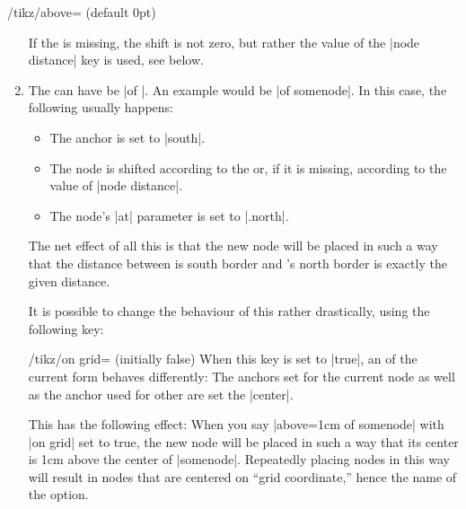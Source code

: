 \begin{key}{/tikz/above= (default 0pt)}
\begin{enumerate}
    If the  is missing, the shift is not zero, but
    rather the value of the |node distance| key is used, see below.
  \item The  can have be |of |. An
    example would be |of somenode|. In this case, the following
    usually happens:
    \begin{itemize}
    \item The anchor is set to |south|.
    \item The node is shifted according to the 
      or, if it is missing, according to the value of |node distance|.
    \item The node's |at| parameter is set to |.north|.
    \end{itemize}
    The net effect of all this is that the new node will be placed in
    such a way that the distance between is south border and
    's north border is exactly the given distance.
\begin{codeexample}[]
\end{codeexample}
    It is possible to change the behaviour of this
     rather drastically, using the following key:
    \begin{key}{/tikz/on grid= (initially false)}
      When this key is set to |true|, an  of the
      current form behaves differently: The anchors set for the
      current node as well as the anchor used for other  are set the |center|.

      This has the following effect: When you say
      |above=1cm of somenode| with |on grid| set to true, the new node
      will be placed in such a way that its center is 1cm above the
      center of |somenode|. Repeatedly placing nodes in this way will
      result in nodes that are centered on ``grid coordinate,'' hence
      the name of the option.
\begin{codeexample}[]
\end{codeexample}
\end{key}
\end{enumerate}
\end{key}

